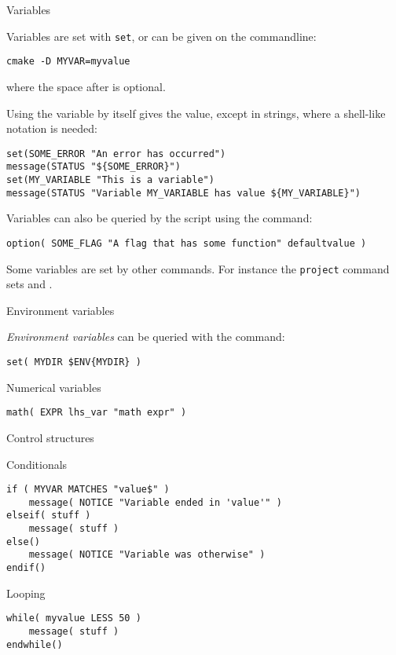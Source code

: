  {Variables}

Variables are set with \texttt{set},
or can be given on the commandline:
\begin{lstlisting}
cmake -D MYVAR=myvalue
\end{lstlisting}
where the space after  is optional.

Using the variable by itself gives the value,
except in strings, where a shell-like notation is needed:
\begin{lstlisting}
set(SOME_ERROR "An error has occurred")
message(STATUS "${SOME_ERROR}")
set(MY_VARIABLE "This is a variable")
message(STATUS "Variable MY_VARIABLE has value ${MY_VARIABLE}")
\end{lstlisting}

Variables can also be queried by the  script using the  command:
\begin{lstlisting}
option( SOME_FLAG "A flag that has some function" defaultvalue )
\end{lstlisting}

Some variables are set by other commands.
For instance the \texttt{project} command sets
 and .

 {Environment variables}

\emph{Environment variables}
can be queried with the  command:
\begin{lstlisting}
set( MYDIR $ENV{MYDIR} )
\end{lstlisting}

 {Numerical variables}

\begin{lstlisting}
math( EXPR lhs_var "math expr" )
\end{lstlisting}

 {Control structures}

 {Conditionals}

\begin{lstlisting}
if ( MYVAR MATCHES "value$" )
    message( NOTICE "Variable ended in 'value'" )
elseif( stuff )
    message( stuff )
else()
    message( NOTICE "Variable was otherwise" )
endif()
\end{lstlisting}

 {Looping}

\begin{lstlisting}
while( myvalue LESS 50 )
    message( stuff )
endwhile()
\end{lstlisting}

